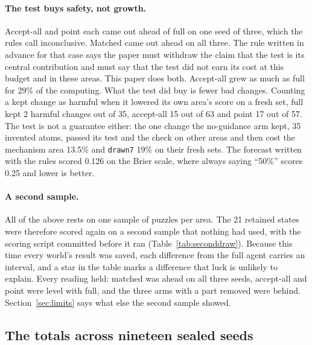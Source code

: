 \documentclass[11pt]{article}
\begin{document}
\paragraph{The test buys safety, not growth.} Accept-all and point each came out ahead of full on one seed of three, which the rules call inconclusive. Matched came out ahead on all three. The rule written in advance for that case says the paper must withdraw the claim that the test is its central contribution and must say that the test did not earn its cost at this budget and in these areas. This paper does both. Accept-all grew as much as full for 29\% of the computing. What the test did buy is fewer bad changes. Counting a kept change as harmful when it lowered its own area's score on a fresh set, full kept 2 harmful changes out of 35, accept-all 15 out of 63 and point 17 out of 57. The test is not a guarantee either: the one change the no-guidance arm kept, 35 invented atoms, passed its test and the check on other areas and then cost the mechanism area 13.5\% and \texttt{drawn7} 19\% on their fresh sets. The forecast written with the rules scored 0.126 on the Brier scale, where always saying ``50\%'' scores 0.25 and lower is better.

\paragraph{A second sample.} All of the above rests on one sample of puzzles per area. The 21 retained states were therefore scored again on a second sample that nothing had used, with the scoring script committed before it ran (Table~\ref{tab:seconddraw}). Because this time every world's result was saved, each difference from the full agent carries an interval, and a star in the table marks a difference that luck is unlikely to explain. Every reading held: matched was ahead on all three seeds, accept-all and point were level with full, and the three arms with a part removed were behind. Section~\ref{sec:limits} says what else the second sample showed.



\subsection{The totals across nineteen sealed seeds}
\end{document}
